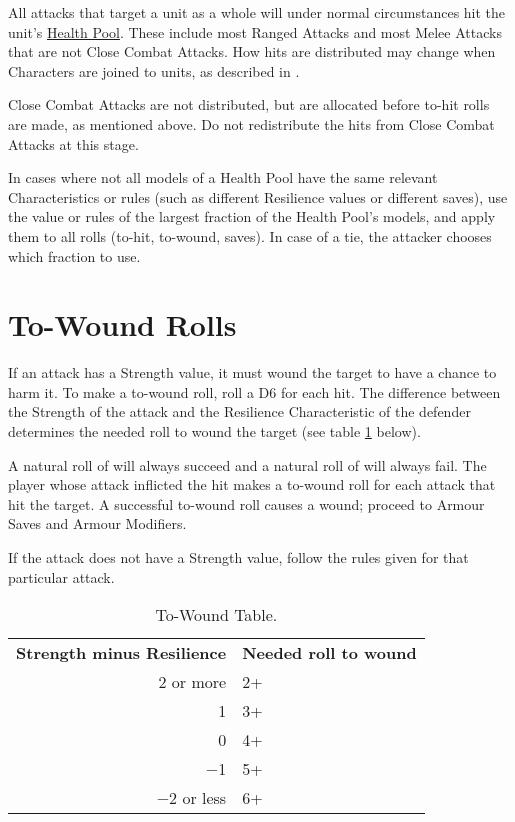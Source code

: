 All attacks that target a unit as a whole will under normal circumstances hit the unit's \rnf{} \hyperref[health_pools]{Health Pool}. These include most Ranged Attacks and most Melee Attacks that are not Close Combat Attacks. How hits are distributed may change when Characters are joined to units, as described in .

Close Combat Attacks are not distributed, but are allocated before to-hit rolls are made, as mentioned above. Do not redistribute the hits from Close Combat Attacks at this stage.

In cases where not all models of a Health Pool have the same relevant Characteristics or rules (such as different Resilience values or different saves), use the value or rules of the largest fraction of the Health Pool's models, and apply them to all rolls (to-hit, to-wound, saves). In case of a tie, the attacker chooses which fraction to use.

\newpage
\section{To-Wound Rolls}
\label{to_wound_rolls}

If an attack has a Strength value, it must wound the target to have a chance to harm it. To make a to-wound roll, roll a D6 for each hit. The difference between the Strength of the attack and the Resilience Characteristic of the defender determines the needed roll to wound the target (see table \ref{table/to-wound_table} below).

A natural roll of  will always succeed and a natural roll of  will always fail. The player whose attack inflicted the hit makes a to-wound roll for each attack that hit the target. A successful to-wound roll causes a wound; proceed to Armour Saves and Armour Modifiers.

If the attack does not have a Strength value, follow the rules given for that particular attack.

\begin{table}[!htbp]
\centering
  \begin{tabular}{r l}
    \hline
    \textbf{Strength minus Resilience} & \textbf{Needed roll to wound} \\
    2 or more & 2+\\
    1 & 3+ \\
    0 & 4+ \\
    −1 & 5+ \\
    −2 or less & 6+\\
    \hline
  \end{tabular}
 \caption{To-Wound Table.}
 \label{table/to-wound_table}
\end{table}

